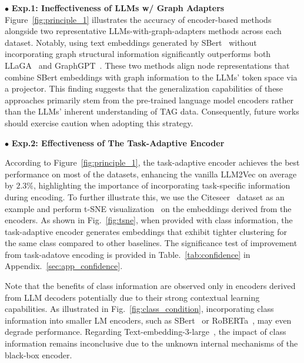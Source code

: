 $\bullet$ \textbf{Exp.1: Ineffectiveness of LLMs w/ Graph Adapters}  
Figure~\ref{fig:principle_1} illustrates the accuracy of encoder-based methods alongside two representative LLMs-with-graph-adapters methods across each dataset. Notably, using text embeddings generated by SBert~\cite{reimers2019sentence} without incorporating graph structural information significantly outperforms both LLaGA~\cite{chen2024llaga} and GraphGPT~\cite{tang2024graphgpt}. These two methods align node representations that combine SBert embeddings with graph information to the LLMs' token space via a projector. This finding suggests that the generalization capabilities of these approaches primarily stem from the pre-trained language model encoders rather than the LLMs' inherent understanding of TAG data. Consequently, future works should exercise caution when adopting this strategy. %



$\bullet$ \textbf{Exp.2: Effectiveness of The Task-Adaptive Encoder}  


According to Figure~\ref{fig:principle_1}, the task-adaptive encoder achieves the best performance on most of the datasets, enhancing the vanilla LLM2Vec on average by $2.3\%$, highlighting the importance of incorporating task-specific information during encoding. 
To further illustrate this, we use the Citeseer~\cite{giles1998citeseer} dataset as an example and perform t-SNE visualization~\cite{van2008visualizing} on the embeddings derived from the encoders. As shown in Fig.~\ref{fig:tsne}, when provided with class information, the task-adaptive encoder generates embeddings that exhibit tighter clustering for the same class compared to other baselines. The significance test of improvement from task-adatove encoding is provided in Table.~\ref{tab:confidence} in Appendix.~\ref{sec:app_confidence}.
%

Note that the benefits of class information are observed only in encoders derived from LLM decoders potentially due to their strong contextual learning capabilities. As illustrated in Fig.~\ref{fig:class_condition}, incorporating class information into smaller LM encoders, such as SBert~\cite{reimers2019sentence} or RoBERTa~\cite{liu2019roberta}, may even degrade performance.  
Regarding Text-embedding-3-large~\cite{openai2024textembedding}, the impact of class information remains inconclusive due to the unknown internal mechanisms of the black-box encoder.







